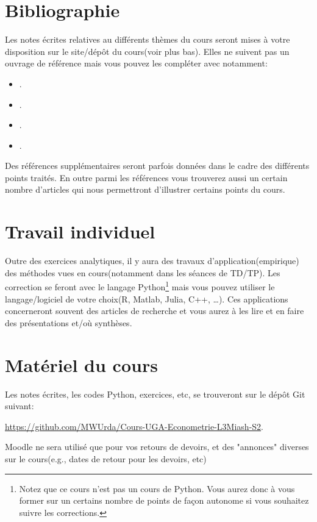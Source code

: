 \section{Bibliographie}

Les notes écrites relatives au différents thèmes du cours seront mises à votre disposition sur le site/dépôt du cours(voir plus bas).
Elles ne suivent pas un ouvrage de référence mais vous pouvez les compléter avec  notamment:
\begin{itemize}[label = -]
\item \cite{Amemiya1985}.
\item \cite{ap2009}.
\item \cite{Hansen2017}.
\item \cite{Wooldridge2010}.
\end{itemize}
Des références supplémentaires seront parfois données dans le cadre des différents points traités.
En outre parmi les références vous trouverez aussi un certain nombre d'articles qui nous 
permettront d'illustrer certains points du cours. 


\section{Travail individuel}
Outre des exercices analytiques, il y aura des travaux d'application(empirique) des méthodes 
vues en cours(notamment dans les séances de TD/TP). Les correction se feront avec le langage 
Python\footnote{Notez que ce cours n'est pas un cours de Python. Vous aurez donc à vous former sur un certains nombre de points 
de façon autonome si vous souhaitez suivre les corrections.} mais vous pouvez utiliser 
le langage/logiciel de votre choix(R, Matlab, Julia, C++, \ldots). Ces applications concerneront souvent 
des articles de recherche et vous aurez à les lire et en faire des présentations et/où synthèses.

\section{Matériel du cours}

Les notes écrites, les codes Python, exercices, etc, se trouveront sur le dépôt Git suivant:

\url{https://github.com/MWUrda/Cours-UGA-Econometrie-L3Miash-S2}.

Moodle ne sera utilisé que pour vos retours de devoirs, et des "annonces" diverses sur le cours(e.g., dates de retour pour les devoirs, etc)


 
